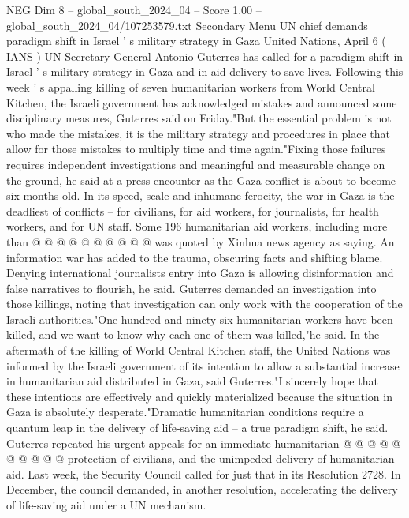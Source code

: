 \begin{textsample}{NEG Dim 8 – global\_south\_2024\_04 – Score 1.00 – global\_south\_2024\_04/107253579.txt}  \label{ex:f8_neg_266}
Secondary Menu UN chief demands paradigm shift in Israel ' s military strategy in Gaza United Nations, April 6 ( IANS ) UN Secretary-General Antonio Guterres has called for a paradigm shift in Israel ' s military strategy in Gaza and in aid delivery to save lives.
Following this week ' s appalling killing of seven humanitarian workers from World Central Kitchen, the Israeli government has acknowledged mistakes and announced some disciplinary measures, Guterres said on Friday."But the essential problem is not who made the mistakes, it is the military strategy and procedures in place that allow for those mistakes to multiply time and time again."Fixing those failures requires independent investigations and meaningful and measurable change on the ground, he said at a press encounter as the Gaza conflict is about to become six months old.
In its speed, scale and inhumane ferocity, the war in Gaza is the deadliest of conflicts -- for civilians, for aid workers, for journalists, for health workers, and for UN staff.
Some 196 humanitarian aid workers, including more than @ @ @ @ @ @ @ @ @ @ was quoted by Xinhua news agency as saying.
An information war has added to the trauma, obscuring facts and shifting blame.
Denying international journalists entry into Gaza is allowing disinformation and false narratives to flourish, he said.
Guterres demanded an investigation into those killings, noting that investigation can only work with the cooperation of the Israeli authorities."One hundred and ninety-six humanitarian workers have been killed, and we want to know why each one of them was killed,"he said.
In the aftermath of the killing of World Central Kitchen staff, the United Nations was informed by the Israeli government of its intention to allow a substantial increase in humanitarian aid distributed in Gaza, said Guterres."I sincerely hope that these intentions are effectively and quickly materialized because the situation in Gaza is absolutely desperate."Dramatic humanitarian conditions require a quantum leap in the delivery of life-saving aid -- a true paradigm shift, he said.
Guterres repeated his urgent appeals for an immediate humanitarian @ @ @ @ @ @ @ @ @ @ protection of civilians, and the unimpeded delivery of humanitarian aid.
Last week, the Security Council called for just that in its Resolution 2728.
In December, the council demanded, in another resolution, accelerating the delivery of life-saving aid under a UN mechanism.

\end{textsample}
